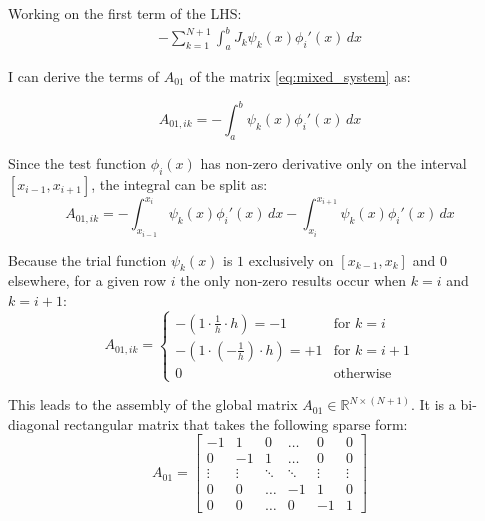 \documentclass{article}
\begin{document}
Working on the first term of the LHS: 
\begin{align*}
    - \sum_{k=1}^{N+1} \int_a^b J_k \psi_k(x) \phi_i'(x) \, dx
\end{align*}

I can derive the terms of $A_{01}$ of the matrix \eqref{eq:mixed_system} as:

\begin{equation*}
    A_{01, ik} = - \int_a^b \psi_k(x) \phi_i'(x) \, dx
\end{equation*}

Since the test function $\phi_i(x)$ has non-zero derivative only on the interval $[x_{i-1}, x_{i+1}]$, the integral can be split as:
\begin{equation*}
    A_{01, ik} = - \int_{x_{i-1}}^{x_{i}} \psi_k(x) \phi_i'(x) \, dx - \int_{x_{i}}^{x_{i+1}} \psi_k(x) \phi_i'(x) \, dx 
\end{equation*}

Because the trial function $\psi_k(x)$ is $1$ exclusively on $[x_{k-1}, x_k]$ and $0$ elsewhere, for a given row $i$ the only non-zero results occur when $k=i$ and $k=i+1$:
\begin{equation*}
    A_{01, ik} = 
    \begin{cases}
         - \left( 1 \cdot \frac{1}{h} \cdot h \right) = -1 & \text{for } k = i \\[1ex]
         - \left( 1 \cdot \left(-\frac{1}{h}\right) \cdot h \right) = +1 & \text{for } k = i + 1 \\[1ex]
         0 & \text{otherwise}
    \end{cases}
\end{equation*}

This leads to the assembly of the global matrix $A_{01} \in \mathbb{R}^{N \times (N+1)}$. It is a bi-diagonal rectangular matrix that takes the following sparse form:
\begin{equation*} \label{eq:matrix_A01}
    A_{01} = 
    \begin{bmatrix}
        -1 &  1 &  0 & \dots &  0 &  0 \\
         0 & -1 &  1 & \dots &  0 &  0 \\
    \vdots & \vdots & \ddots & \ddots & \vdots & \vdots \\
         0 &  0 & \dots & -1 &  1 &  0 \\
         0 &  0 & \dots &  0 & -1 &  1
    \end{bmatrix}
\end{equation*}
\end{document}
